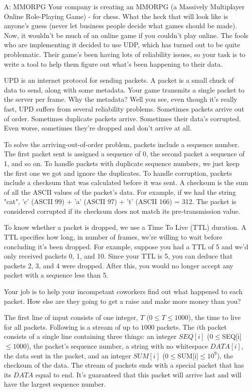 \begin{problem}{A: MMORPG}
Your company is creating an MMORPG (a Massively Multiplayer Online Role-Playing Game) - for chess. What the heck that will look like is anyone's guess (never let business people decide what games should be made). Now, it wouldn't be much of an online game if you couldn't play online. The fools who are implementing it decided to use UDP, which has turned out to be quite problematic. Their game's been having lots of reliability issues, so your task is to write a tool to help them figure out what's been happening to their data.

UPD is an internet protocol for sending packets. A packet is a small chuck of data to send, along with some metadata. Your game transmits a single packet to the server per frame. Why the metadata? Well you see, even though it's really fast, UPD suffers from several reliability problems. Sometimes packets arrive out of order. Sometimes duplicate packets arrive. Sometimes their data's corrupted. Even worse, sometimes they're dropped and don't arrive at all.

To solve the arriving-out-of-order problem, packets include a sequence number. The first packet sent is assigned a sequence of 0, the second packet a sequence of 1, and so on. To handle packets with duplicate sequence numbers, we just keep the first one we got and ignore the duplicates. To handle corruption, packets include a checksum that was calculated before it was sent. A checksum is the sum of all the ASCII values of the packet's data. For example, if we had the string "cat", 'c' (ASCII 99) + 'a' (ASCII 97) + 't' (ASCII 166) = 312. The packet is considered corrupted if its checksum does not match its pre-transmission value. 

To know whether a packet is dropped, we use a Time To Live (TTL) duration. A TTL specifies how long, in number of frames, we're willing to wait before concluding it's been dropped. For example, suppose you had a TTL of 5 and we'd only received packets 0, 1, and 10. Since your TTL is 5, you can deduce that packets 2, 3, and 4 were dropped. After this, you would no longer accept any packet with a sequence less than 5.

Your job is to help your incompetant coworkers find out what happened to each packet. How else are they going to get a raise and make more money than you?
\end{problem}

\begin{formalin}
The first line of input consists of one integer, $T$ ($0 \leq T \leq 1000$), the time to live for all packets. Following is a stream of up to $1000$ packets. The $i$th packet consists of a single line containing three things: an integer $SEQ[i]$ ($0 \leq $SEQ[i]$ \leq 1000$), the packet's sequence number, a string with no whitespace $DATA[i]$, the data sent in the packet, and an integer $SUM[i]$ ($0 \leq $SUM[i]$ \leq 10^{9}$), the checksum of the data. The stream of packets ends with a special packet that has its $DATA$ equal to end. It's guaranteed that this packet will arrive last and will have the largest sequence number.

\end{formalin}

